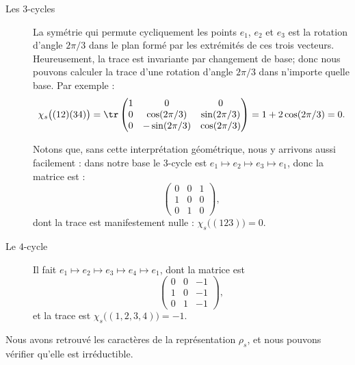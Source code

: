 \begin{description}
    \item[Les \( 3\)-cycles]

        La symétrie qui permute cycliquement les points \( e_1\), \( e_2\) et \( e_3\) est la rotation d'angle \( 2\pi/3\) dans le plan formé par les extrémités de ces trois vecteurs. Heureusement, la trace est invariante par changement de base; donc nous pouvons calculer la trace d'une rotation d'angle \( 2\pi/3\) dans n'importe quelle base. Par exemple :
        \begin{equation}
            \chi_s\big( (12)(34) \big)=\tr\begin{pmatrix}
                1    &   0    &   0    \\
                0    &   \cos(2\pi/3)    &   \sin(2\pi/3)    \\
                0    &   -\sin(2\pi/3)    &   \cos(2\pi/3)
            \end{pmatrix}=1+2\cos(2\pi/3)=0.
        \end{equation}

        Notons que, sans cette interprétation géométrique, nous y arrivons aussi facilement : dans notre base le \( 3\)-cycle est \( e_1\mapsto e_2\mapsto e_3\mapsto e_1\), donc la matrice est :
        \begin{equation}
            \begin{pmatrix}
                0    &   0    &   1    \\
                1    &   0    &   0    \\
                0    &   1    &   0
            \end{pmatrix},
        \end{equation}
        dont la trace est manifestement nulle : \( \chi_s\big( (123) \big)=0\).

    \item[Le \( 4\)-cycle]

        Il fait \( e_1\mapsto e_2\mapsto e_3\mapsto e_4\mapsto e_1\), dont la matrice est
        \begin{equation}        \label{EQooONDUooYlduup}
            \begin{pmatrix}
                0    &   0    &   -1    \\
                1    &   0    &   -1    \\
                0    &   1    &   -1
            \end{pmatrix},
        \end{equation}
        et la trace est \( \chi_s\big( (1,2,3,4) \big)=-1\).
\end{description}
Nous avons retrouvé les caractères de la représentation \( \rho_s\), et nous pouvons vérifier qu'elle est irréductible.

